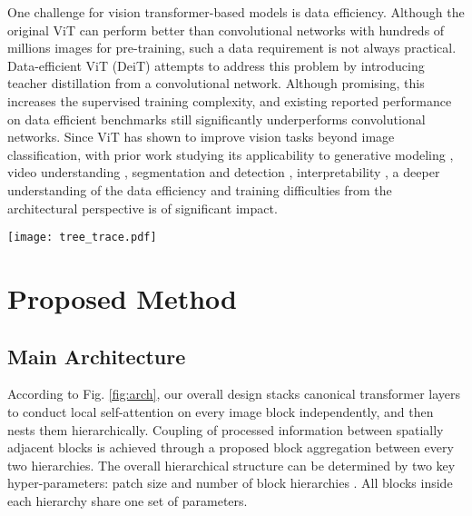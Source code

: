\documentclass{article}
\newcommand{\OURS}{NesT\xspace}
\begin{document}
One challenge for vision transformer-based models is data efficiency. 
Although the original ViT \cite{dosovitskiy2020image} can perform better than convolutional networks with hundreds of millions images for pre-training, such a data requirement is not always practical.
Data-efficient ViT (DeiT) \cite{touvron2020training,touvron2021going} attempts to address this problem by introducing teacher distillation from a convolutional network. 
Although promising, this increases the supervised training complexity, and existing reported performance on data efficient benchmarks \cite{hassani2021escaping,chen2021visformer} still significantly underperforms convolutional networks.
Since ViT has shown to improve vision tasks beyond image classification, with prior work studying its applicability to generative modeling \cite{parmar2018image,child2019generating,jiang2021transgan,hudson2021generative}, video understanding \cite{neimark2021video,akbari2021vatt}, segmentation and detection \cite{wang2020max,liang2020polytransform,kim2021hotr}, interpretability \cite{chefer2021generic,abnar2020quantifying}, a deeper understanding of the data efficiency and training difficulties from the architectural perspective is of significant impact.


\begin{figure*}[t]
\centering
\texttt{[image: tree\_trace.pdf]} 
\caption{Example results of the proposed GradCAT. Given the left input image (containing four objects), the figure visualizes the top-4 class traversal results (4 colors) using an ImageNet-trained \OURS (with three tree hierarchies). 
Each tree node denotes the averaged activation value ( defined in Algorithm \ref{alg:gat}). 
The traversals can correctly find the model decision path along the tree to locate an image patch belonging to the objects of given target classes.}
\label{fig:treetrace}
\vspace{-.2cm}
\end{figure*} 

\section{Proposed Method}
\subsection{Main Architecture}
According to Fig. \ref{fig:arch}, our overall design stacks canonical transformer layers to conduct local self-attention on every image block independently, and then nests them hierarchically. 
Coupling of processed information between spatially adjacent blocks is achieved through a proposed block aggregation between every two hierarchies. 
The overall hierarchical structure can be determined by two key hyper-parameters: patch size  and number of block hierarchies . 
All blocks inside each hierarchy share one set of parameters.
\end{document}
